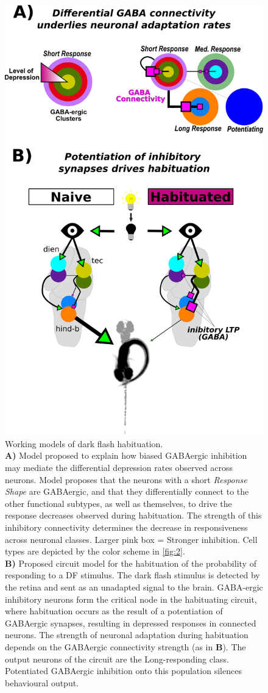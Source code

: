 \documentclass[9pt,lineno]{RandlettLab_elife}
\begin{document}
\begin{figure}
\includegraphics[width=.35\textwidth]{Figure8_Model.png}
\caption{
Working models of dark flash habituation.
\\ \textbf{A)} Model proposed to explain how biased GABAergic inhibition may mediate the differential depression rates observed across neurons. Model proposes that the neurons with a short \emph{Response Shape} are GABAergic, and that they differentially connect to the other functional subtypes, as well as themselves, to drive the response decreases observed during habituation. The strength of this inhibitory connectivity determines the decrease in responsiveness across neuronal classes. Larger pink box = Stronger inhibition. Cell types are depicted by the color scheme in \autoref{fig:2}.
\\ \textbf{B)} Proposed circuit model for the habituation of the probability of responding to a DF stimulus. The dark flash stimulus is detected by the retina and sent as an unadapted signal to the brain. GABA-ergic inhibitory neurons form the critical node in the habituating circuit, where habituation occurs as the result of a potentiation of GABAergic synapses, resulting in depressed responses in connected neurons. The strength of neuronal adaptation during habituation depends on the GABAergic connectivity strength (as in  \textbf{B}). The output neurons of the circuit are the Long-responding class. Potentiated GABAergic inhibition onto this population silences behavioural output. 
}
\label{fig:8}
\end{figure}
\end{document}
